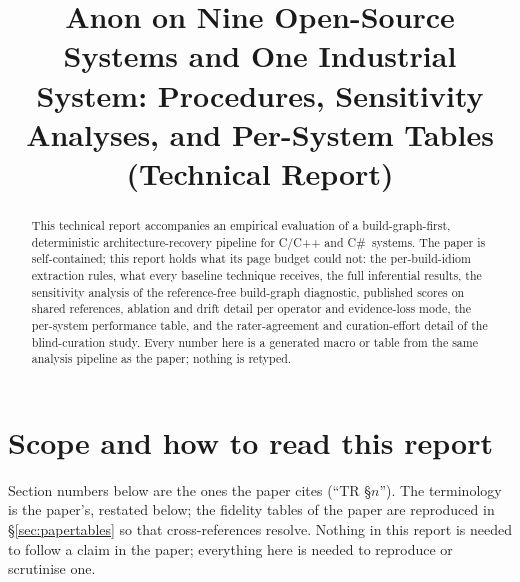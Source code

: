 \documentclass[10pt,conference]{IEEEtran}
\newif\ifanonymous
\begin{document}
\ifanonymous
  \title{Build-Graph-First Architecture Recovery on Nine Open-Source Systems and One Industrial
  System: Procedures, Sensitivity Analyses, and Per-System Tables}
\else
  \title{Anon on Nine Open-Source Systems and One Industrial System: Procedures, Sensitivity
  Analyses, and Per-System Tables (Technical Report)}
\fi

\ifanonymous
  \author{\IEEEauthorblockN{Anonymous Author(s)}
  \IEEEauthorblockA{Affiliation withheld for double-anonymous review}}
\else
  \author{
  }
\fi

\maketitle

\begin{abstract}
This technical report accompanies an empirical evaluation of a build-graph-first, deterministic
architecture-recovery pipeline for C/C++ and C\#\ systems. The paper is self-contained; this
report holds what its page budget could not: the per-build-idiom extraction rules, what every
baseline technique receives, the full inferential results, the sensitivity analysis of the
reference-free build-graph diagnostic, published scores on shared references, ablation and drift
detail per operator and evidence-loss mode, the per-system performance table, and the
rater-agreement and curation-effort detail of the blind-curation study. Every number here is a
generated macro or table from the same analysis pipeline as the paper; nothing is retyped.
\end{abstract}

\section{Scope and how to read this report}
\label{sec:scope}\label{sec:design}\label{sec:corpus}\label{sec:baselines}   %

Section numbers below are the ones the paper cites (``TR \S$n$''). The terminology is the
paper's, restated below; the fidelity tables of the paper are reproduced in
\S\ref{sec:papertables} so that cross-references resolve. Nothing in this report is needed to
follow a claim in the paper; everything here is needed to reproduce or scrutinise one.


\end{document}
